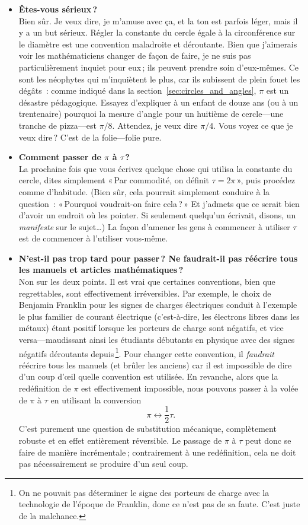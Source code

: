 \begin{itemize}

  \item \textbf{Êtes-vous sérieux\,?} \\ Bien sûr. Je veux dire, je m'amuse avec ça, et la ton est parfois léger, mais il y a un but sérieux. Régler la constante du cercle égale à la circonférence sur le diamètre est une convention maladroite et déroutante. Bien que j'aimerais voir les mathématiciens changer de façon de faire, je ne suis pas particulièrement inquiet pour eux\,; ils peuvent prendre soin d'eux-mêmes. Ce sont les néophytes qui m'inquiètent le plus, car ils subissent de plein fouet les dégâts~: comme indiqué dans la section~\ref{sec:circles_and_angles}, $\pi$ est un désastre pédagogique. Essayez d'expliquer à un enfant de douze ans (ou à un trentenaire) pourquoi la mesure d'angle pour un huitième de cercle---une tranche de pizza---est $\pi/8$. Attendez, je veux dire $\pi/4$. Vous voyez ce que je veux dire\,? C'est de la folie---folie pure.

  \item \textbf{Comment passer de $\pi$ à $\tau$\,?} \\ La prochaine fois que vous écrivez quelque chose qui utilisa la constante du cercle, dites simplement «\,Par commodité, on définit $\tau=2\pi$\,», puis procédez comme d'habitude. (Bien sûr, cela pourrait simplement conduire à la question~: «\,Pourquoi voudrait-on faire cela\,?\,» Et j'admets que ce serait bien d'avoir un endroit où les pointer. Si seulement quelqu'un écrivait, disons, un \emph{manifeste} sur le sujet\ldots) La façon d'amener les gens à commencer à utiliser $\tau$ est de commencer à l'utiliser vous-même.

  \item \textbf{N'est-il pas trop tard pour passer\,? Ne faudrait-il pas réécrire tous les manuels et articles mathématiques\,?} \\ Non sur les deux points. Il est vrai que certaines conventions, bien que regrettables, sont effectivement irréversibles. Par exemple, le choix de Benjamin Franklin pour les signes de charges électriques conduit à l'exemple le plus familier de courant électrique (c'est-à-dire, les électrons libres dans les métaux) étant positif lorsque les porteurs de charge sont négatifs, et vice versa---maudissant ainsi les étudiants débutants en physique avec des signes négatifs déroutants depuis\,\footnote{On ne pouvait pas déterminer le signe des porteurs de charge avec la technologie de l'époque de Franklin, donc ce n'est pas de sa faute. C'est juste de la malchance.}. Pour changer cette convention, il \emph{faudrait} réécrire tous les manuels (et brûler les anciens) car il est impossible de dire d'un coup d'œil quelle convention est utilisée. En revanche, alors que la redéfinition de $\pi$ est effectivement impossible, nous pouvons passer à la volée de $\pi$ à $\tau$ en utilisant la conversion \[ \pi \leftrightarrow \textstyle{\frac{1}{2}}\tau. \] C'est purement une question de substitution mécanique, complètement robuste et en effet entièrement réversible. Le passage de $\pi$ à $\tau$ peut donc se faire de manière incrémentale\,; contrairement à une redéfinition, cela ne doit pas nécessairement se produire d'un seul coup.


\end{itemize}
